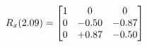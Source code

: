 \documentclass[preview]{standalone}
\begin{document}
\begin{align*}
\special{dvisvgm:raw <g id='unique000'>}R_{x}(2.09) = \begin{bmatrix}1 & 0 & 0 \\0 & -0.50 & -0.87 \\0 & +0.87 & -0.50\end{bmatrix}\special{dvisvgm:raw </g>}
\end{align*}
\end{document}
